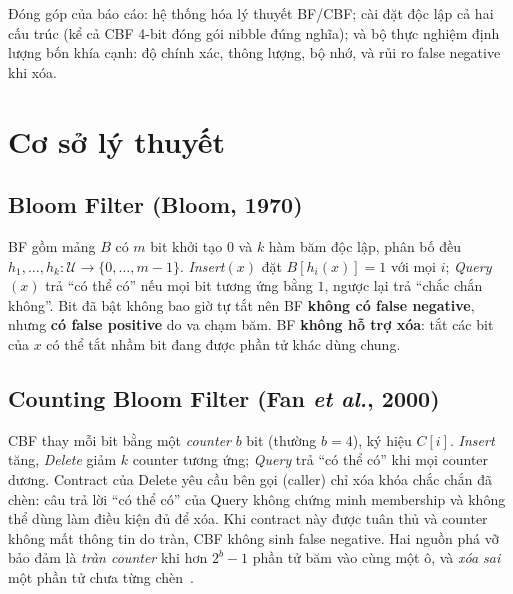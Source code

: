 \documentclass[11pt,a4paper]{article}
\begin{document}
Đóng góp của báo cáo: hệ thống hóa lý thuyết BF/CBF; cài đặt độc lập cả hai
cấu trúc (kể cả CBF 4-bit đóng gói nibble đúng nghĩa); và bộ thực nghiệm định
lượng bốn khía cạnh: độ chính xác, thông lượng, bộ nhớ, và rủi ro false
negative khi xóa.

\section{Cơ sở lý thuyết}
\subsection{Bloom Filter (Bloom, 1970)}
BF gồm mảng $B$ có $m$ bit khởi tạo $0$ và $k$ hàm băm độc lập, phân bố đều
$h_1,\dots,h_k:\mathcal{U}\to\{0,\dots,m-1\}$. \emph{Insert}$(x)$ đặt
$B[h_i(x)]=1$ với mọi $i$; \emph{Query}$(x)$ trả ``có thể có'' nếu mọi bit
tương ứng bằng $1$, ngược lại trả ``chắc chắn không''. Bit đã bật không bao
giờ tự tắt nên BF \textbf{không có false negative}, nhưng \textbf{có false
positive} do va chạm băm. BF \textbf{không hỗ trợ xóa}: tắt các bit của $x$
có thể tắt nhầm bit đang được phần tử khác dùng chung.

\subsection{Counting Bloom Filter (Fan \emph{et al.}, 2000)}
CBF thay mỗi bit bằng một \emph{counter} $b$ bit (thường $b=4$), ký hiệu
$C[i]$. \emph{Insert} tăng, \emph{Delete} giảm $k$ counter tương ứng;
\emph{Query} trả ``có thể có'' khi mọi counter dương. Contract của Delete yêu
cầu bên gọi (caller) chỉ xóa khóa chắc chắn đã chèn: câu trả lời ``có thể có'' của Query
không chứng minh membership và không thể dùng làm điều kiện đủ để xóa. Khi
contract này được tuân thủ và counter không mất thông tin do tràn, CBF không
sinh false negative. Hai nguồn phá vỡ bảo đảm là \emph{tràn counter} khi hơn
$2^b-1$ phần tử băm vào cùng một ô, và \emph{xóa sai} một phần tử chưa từng
chèn~\cite{fan2000,broder2004}.
\end{document}

